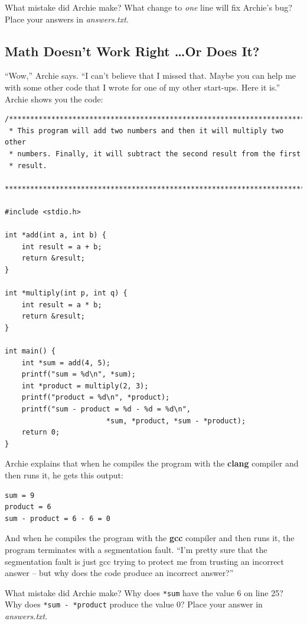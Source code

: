 What mistake did Archie make? What change to \textit{one} line will fix
Archie's bug? Place your answers in \textit{answers.txt}.

\subsection{Math Doesn't Work Right \dots Or Does It?}\label{sec:localAddresses}

``Wow,'' Archie says. ``I can't believe that I missed that. Maybe you can help
me with some other code that I wrote for one of my other start-ups. Here it
is.'' Archie shows you the code:

\begin{lstlisting}
/***********************************************************************
 * This program will add two numbers and then it will multiply two other
 * numbers. Finally, it will subtract the second result from the first
 * result.
 ***********************************************************************/

#include <stdio.h>

int *add(int a, int b) {
    int result = a + b;
    return &result;
}

int *multiply(int p, int q) {
    int result = a * b;
    return &result;
}

int main() {
    int *sum = add(4, 5);
    printf("sum = %d\n", *sum);
    int *product = multiply(2, 3);
    printf("product = %d\n", *product);
    printf("sum - product = %d - %d = %d\n",
                        *sum, *product, *sum - *product);
    return 0;
}
\end{lstlisting}

Archie explains that when he compiles the program with the \textbf{clang}
compiler and then runs it, he gets this output:

\begin{verbatim}
sum = 9
product = 6
sum - product = 6 - 6 = 0
\end{verbatim}

And when he compiles the program with the \textbf{gcc} compiler and then runs
it, the program terminates with a segmentation fault. ``I'm pretty sure that
the segmentation fault is just gcc trying to protect me from trusting an
incorrect answer -- but why does the code produce an incorrect answer?''

What mistake did Archie make? Why does \lstinline{*sum} have the value 6 on
line 25? Why does \lstinline{*sum - *product} produce the value 0? Place your
answer in \textit{answers.txt}.


